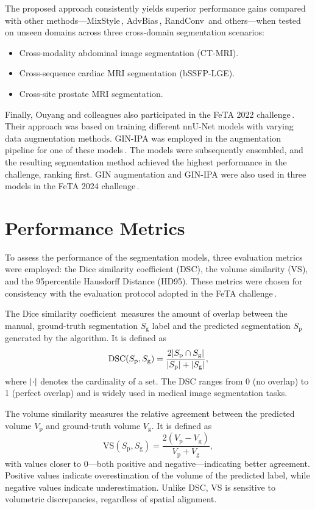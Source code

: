 The proposed approach consistently yields superior performance gains compared with other methods---MixStyle\,\cite{Zhou2021}, AdvBias\,\cite{Chen2020}, RandConv\,\cite{Xu2021} and others---when tested on unseen domains across three cross-domain segmentation scenarios:
\begin{itemize}
    \item Cross-modality abdominal image segmentation (CT-MRI).
    \item Cross-sequence cardiac MRI segmentation (bSSFP-LGE).
    \item Cross-site prostate MRI segmentation.
\end{itemize}

Finally, Ouyang and colleagues also participated in the FeTA 2022 challenge\,\cite{FeTA2022_review}. Their approach was based on training different nnU-Net models with varying data augmentation methods. GIN-IPA was employed in the augmentation pipeline for one of these models\,\cite{FeTA2022_top}. The models were subsequently ensembled, and the resulting segmentation method achieved the highest performance in the challenge, ranking first. GIN augmentation and GIN-IPA were also used in three models in the FeTA 2024 challenge\,\cite{FeTA2024_review}.

\section{Performance Metrics}
To assess the performance of the segmentation models, three evaluation metrics were employed: the Dice similarity coefficient (DSC), the volume similarity (VS), and the 95\th percentile Hausdorff Distance (HD95). These metrics were chosen for consistency with the evaluation protocol adopted in the FeTA challenge\,\cite{FeTA2021_review}.

The Dice similarity coefficient\,\cite{Dice1945,FeTA2021_review} measures the amount of overlap between the manual, ground-truth segmentation $S_\text{g}$ label and the predicted segmentation $S_\text{p}$ generated by the algorithm. It is defined as
\begin{equation}
    \text{DSC}(S_\text{p}, S_\text{g}) = \frac{2 \lvert S_\text{p} \cap S_\text{g}\rvert}{\lvert S_\text{p}\rvert + \lvert S_\text{g}\rvert},
\end{equation}
where $\lvert\cdot\rvert$ denotes the cardinality of a set. The DSC ranges from \num{0} (no overlap) to \num{1} (perfect overlap) and is widely used in medical image segmentation tasks.

The volume similarity measures the relative agreement between the predicted volume $V_\text{p}$ and ground-truth volume $V_\text{g}$. It is defined as
\begin{equation}
    \text{VS}(S_\text{p}, S_\text{g}) = \frac{2(V_\text{p} - V_\text{g})}{V_\text{p} + V_\text{g}},
\end{equation}
with values closer to \num{0}---both positive and negative---indicating better agreement. Positive values indicate overestimation of the volume of the predicted label, while negative values indicate underestimation. Unlike DSC, VS is sensitive to volumetric discrepancies, regardless of spatial alignment.

